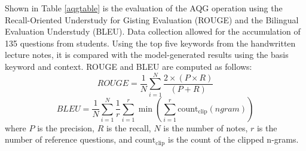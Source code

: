 \documentclass[conference]{IEEEtran}
\begin{document}
\indent Shown in Table \ref{aqgtable} is the evaluation of the AQG operation
using the Recall-Oriented Understudy for Gisting Evaluation (ROUGE) and the
Bilingual Evaluation Understudy (BLEU). Data collection allowed for 
the accumulation of 135 questions from students. Using the top five 
keywords from the handwritten lecture notes, 
it is compared with the model-generated results using the basis keyword 
and context. ROUGE and BLEU are computed as 
follows:
\begin{equation}
    ROUGE = \frac{1}{N} \sum_{i=1}^{N} \frac{2 \times (P \times R)}{(P + R)}
\end{equation}
\begin{equation}
    BLEU = \frac{1}{N} \sum_{i=1}^{N} \frac{1}{r} \sum_{i=1}^{r} \min \left( \sum_{i=1}^{r} \text{count}_{\text{clip}}(ngram) \right)
\end{equation}
where $P$ is the precision, $R$ is the recall, $N$ is the number of notes, $r$ is the number of reference questions, and $\text{count}_{\text{clip}}$ is the count of the clipped n-grams.
\end{document}
